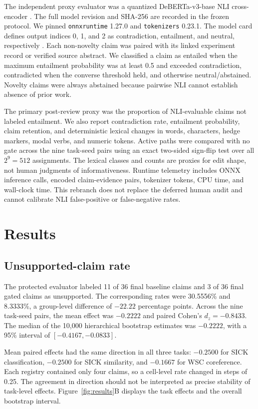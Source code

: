 \documentclass[11pt]{article}
\begin{document}
The independent proxy evaluator was a quantized DeBERTa-v3-base NLI cross-encoder \cite{debertav3,debertanli}. The full model revision and SHA-256 are recorded in the frozen protocol. We pinned \texttt{onnxruntime} 1.27.0 and \texttt{tokenizers} 0.23.1. The model card defines output indices 0, 1, and 2 as contradiction, entailment, and neutral, respectively \cite{debertanli}. Each non-novelty claim was paired with its linked experiment record or verified source abstract. We classified a claim as entailed when the maximum entailment probability was at least 0.5 and exceeded contradiction, contradicted when the converse threshold held, and otherwise neutral/abstained. Novelty claims were always abstained because pairwise NLI cannot establish absence of prior work.

The primary post-review proxy was the proportion of NLI-evaluable claims not labeled entailment. We also report contradiction rate, entailment probability, claim retention, and deterministic lexical changes in words, characters, hedge markers, modal verbs, and numeric tokens. Active paths were compared with no gate across the nine task-seed pairs using an exact two-sided sign-flip test over all $2^9=512$ assignments. The lexical classes and counts are proxies for edit shape, not human judgments of informativeness. Runtime telemetry includes ONNX inference calls, encoded claim-evidence pairs, tokenizer tokens, CPU time, and wall-clock time. This rebranch does not replace the deferred human audit and cannot calibrate NLI false-positive or false-negative rates.

\section{Results}

\subsection{Unsupported-claim rate}

The protected evaluator labeled 11 of 36 final baseline claims and 3 of 36 final gated claims as unsupported. The corresponding rates were 30.5556\% and 8.3333\%, a group-level difference of $-22.22$ percentage points. Across the nine task-seed pairs, the mean effect was $-0.2222$ and paired Cohen's $d_z=-0.8433$. The median of the 10,000 hierarchical bootstrap estimates was $-0.2222$, with a 95\% interval of $[-0.4167,-0.0833]$.

Mean paired effects had the same direction in all three tasks: $-0.2500$ for SICK classification, $-0.2500$ for SICK similarity, and $-0.1667$ for WSC coreference. Each registry contained only four claims, so a cell-level rate changed in steps of 0.25. The agreement in direction should not be interpreted as precise stability of task-level effects. Figure~\ref{fig:results}B displays the task effects and the overall bootstrap interval.
\end{document}
